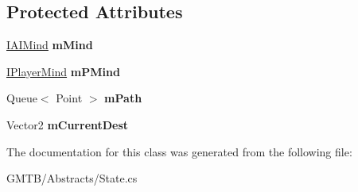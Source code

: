 \subsection*{Protected Attributes}
\begin{DoxyCompactItemize}
\item 
\mbox{\label{class_g_m_t_b_1_1_abstracts_1_1_state_a872a34a99a93997bf5e037b2dd7970aa}} 
\mbox{\hyperlink{interface_g_m_t_b_1_1_interfaces_1_1_i_a_i_mind}{I\+A\+I\+Mind}} {\bfseries m\+Mind}
\item 
\mbox{\label{class_g_m_t_b_1_1_abstracts_1_1_state_a4da4ec0eb8ab8819c92f86a251ed42af}} 
\mbox{\hyperlink{interface_g_m_t_b_1_1_interfaces_1_1_i_player_mind}{I\+Player\+Mind}} {\bfseries m\+P\+Mind}
\item 
\mbox{\label{class_g_m_t_b_1_1_abstracts_1_1_state_a41ea8bb4a207c7395895bafdd006e511}} 
Queue$<$ Point $>$ {\bfseries m\+Path}
\item 
\mbox{\label{class_g_m_t_b_1_1_abstracts_1_1_state_a31402b05fb616b02e7466cdba5a325c5}} 
Vector2 {\bfseries m\+Current\+Dest}
\end{DoxyCompactItemize}


The documentation for this class was generated from the following file\+:\begin{DoxyCompactItemize}
\item 
G\+M\+T\+B/\+Abstracts/State.\+cs\end{DoxyCompactItemize}
